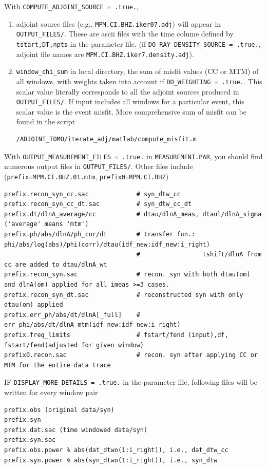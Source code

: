 \documentclass[11pt,titlepage,fleqn]{article}
\begin{document}
With \verb+COMPUTE_ADJOINT_SOURCE = .true.+,
\begin{enumerate}
\item adjoint source files (e.g., \verb+MPM.CI.BHZ.iker07.adj+) will appear
in \verb+OUTPUT_FILES/+. These are ascii files with the time colume defined by \verb+tstart,DT,npts+ in the parameter file.
(if \verb+DO_RAY_DENSITY_SOURCE = .true.+, adjoint file names are \verb+MPM.CI.BHZ.iker7.density.adj+).

\item \verb+window_chi_sum+ in local directory, the sum of misfit values (CC or MTM) of all windows, with weights taken into account if \verb+DO_WEIGHTING = .true.+. This scalar value literally corresponds to all the adjoint sources produced in  \verb+OUTPUT_FILES/+. If input includes all windows for a particular event, this scalar value is the event misfit.
More comprehensive sum of misfit can be found in the script
\begin{verbatim}
/ADJOINT_TOMO/iterate_adj/matlab/compute_misfit.m
\end{verbatim}
\end{enumerate}

With \verb+OUTPUT_MEASUREMENT_FILES = .true.+ in \verb+MEASUREMENT.PAR+, you should find numerous output files in \verb+OUTPUT_FILES/+.
Other files include (\verb+prefix=MPM.CI.BHZ.01.mtm+, \verb+prefix0=MPM.CI.BHZ+)
\begin{verbatim}
prefix.recon_syn_cc.sac             # syn_dtw_cc
prefix.recon_syn_cc_dt.sac          # syn_dtw_cc_dt
prefix.dt/dlnA_average/cc           # dtau/dlnA_meas, dtaul/dlnA_sigma ('average' means 'mtm')
prefix.ph/abs/dlnA/ph_cor/dt        # transfer fun.:  phi/abs/log(abs)/phi(corr)/dtau(idf_new:idf_new:i_right)
                                    #                 tshift/dlnA from cc are added to dtau/dlnA_wt
prefix.recon_syn.sac                # recon. syn with both dtau(om) and dlnA(om) applied for all imeas >=3 cases.
prefix.recon_syn_dt.sac             # reconstructed syn with only dtau(om) applied
prefix.err_ph/abs/dt/dlnA[_full]    # err_phi/abs/dt/dlnA_mtm(idf_new:idf_new:i_right)
prefix.freq_limits                  # fstart/fend (input),df, fstart/fend(adjusted for given window)
prefix0.recon.sac                   # recon. syn after applying CC or MTM for the entire data trace
\end{verbatim}

IF \verb+DISPLAY_MORE_DETAILS = .true.+ in the parameter file, following files will be written for every window pair
\begin{verbatim}
prefix.obs (original data/syn)
prefix.syn
prefix.dat.sac (time windowed data/syn)
prefix.syn.sac
prefix.obs.power % abs(dat_dtwo(1:i_right)), i.e., dat_dtw_cc
prefix.syn.power % abs(syn_dtwo(1:i_right)), i.e., syn_dtw
\end{verbatim}
\end{document}
